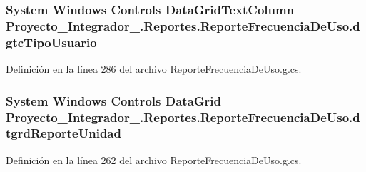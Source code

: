 \hypertarget{class_proyecto___integrador__3_1_1_reportes_1_1_reporte_frecuencia_de_uso_a62c05d7f22acb7b7a12bc1e8777906cc}{
\subsubsection[{dgtc\-Tipo\-Usuario}]{\setlength{\rightskip}{0pt plus 5cm}System Windows Controls Data\-Grid\-Text\-Column Proyecto\-\_\-\-Integrador\-\_.\-Reportes.\-Reporte\-Frecuencia\-De\-Uso.\-dgtc\-Tipo\-Usuario\hspace{0.3cm}{\ttfamily [package]}}}\label{class_proyecto___integrador__3_1_1_reportes_1_1_reporte_frecuencia_de_uso_a62c05d7f22acb7b7a12bc1e8777906cc}


Definición en la línea 286 del archivo Reporte\-Frecuencia\-De\-Uso.\-g.\-cs.

\hypertarget{class_proyecto___integrador__3_1_1_reportes_1_1_reporte_frecuencia_de_uso_a76928c8b382b0997a3e7a9f57369c6c0}{
\subsubsection[{dtgrd\-Reporte\-Unidad}]{\setlength{\rightskip}{0pt plus 5cm}System Windows Controls Data\-Grid Proyecto\-\_\-\-Integrador\-\_.\-Reportes.\-Reporte\-Frecuencia\-De\-Uso.\-dtgrd\-Reporte\-Unidad\hspace{0.3cm}{\ttfamily [package]}}}\label{class_proyecto___integrador__3_1_1_reportes_1_1_reporte_frecuencia_de_uso_a76928c8b382b0997a3e7a9f57369c6c0}


Definición en la línea 262 del archivo Reporte\-Frecuencia\-De\-Uso.\-g.\-cs.

